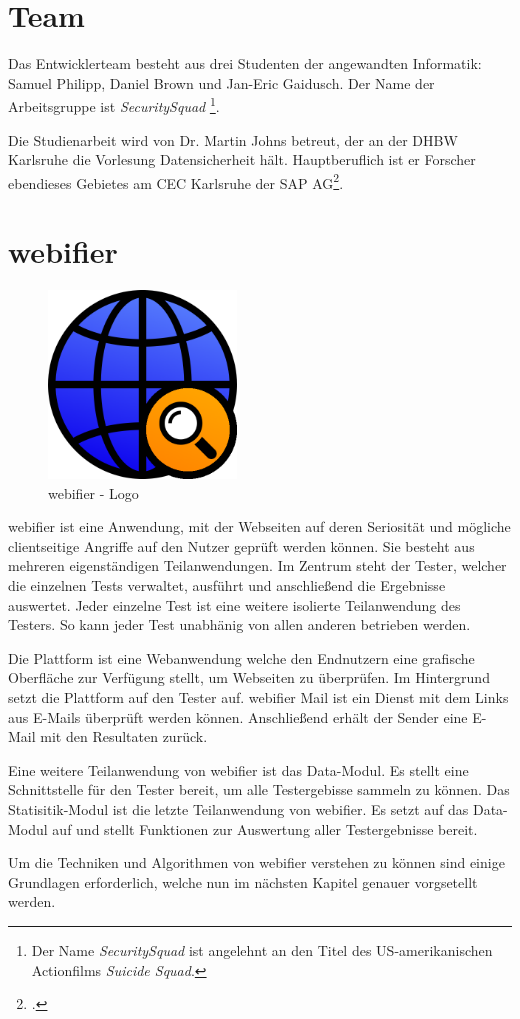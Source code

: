 \section{Team}
Das Entwicklerteam besteht aus drei Studenten der angewandten Informatik:
Samuel Philipp, Daniel Brown und Jan-Eric Gaidusch.
Der Name der Arbeitsgruppe ist \textit{SecuritySquad}
\footnote{Der Name \textit{SecuritySquad} ist angelehnt an den Titel des US-amerikanischen Actionfilms \textit{Suicide Squad}.}.

Die Studienarbeit wird von Dr. Martin Johns betreut, der an der DHBW Karlsruhe die Vorlesung Datensicherheit hält. Hauptberuflich ist er Forscher ebendieses Gebietes am CEC Karlsruhe der SAP AG\footcite{johnsProfile}.

\section{webifier}

\begin{figure}[H]
  \centering
  \includegraphics[width=5cm]{images/webifier}
  \caption{webifier - Logo}
  \label{fig:webifier-logo}
\end{figure}

webifier ist eine Anwendung, mit der Webseiten auf deren Seriosität und mögliche clientseitige Angriffe auf den Nutzer geprüft werden können. Sie besteht aus mehreren eigenständigen Teilanwendungen. Im Zentrum steht der Tester, welcher die einzelnen Tests verwaltet, ausführt und anschließend die Ergebnisse auswertet. Jeder einzelne Test ist eine weitere isolierte Teilanwendung des Testers. So kann jeder Test unabhänig von allen anderen betrieben werden.

Die Plattform ist eine Webanwendung welche den Endnutzern eine grafische Oberfläche zur Verfügung stellt, um Webseiten zu überprüfen. Im Hintergrund setzt die Plattform auf den Tester auf. webifier Mail ist ein Dienst mit dem Links aus E-Mails überprüft werden können. Anschließend erhält der Sender eine E-Mail mit den Resultaten zurück.

Eine weitere Teilanwendung von webifier ist das Data-Modul. Es stellt eine Schnittstelle für den Tester bereit, um alle Testergebisse sammeln zu können. Das Statisitik-Modul ist die letzte Teilanwendung von webifier. Es setzt auf das Data-Modul auf und stellt Funktionen zur Auswertung aller Testergebnisse bereit.

Um die Techniken und Algorithmen von webifier verstehen zu können sind einige Grundlagen erforderlich, welche nun im nächsten Kapitel genauer vorgsetellt werden.
